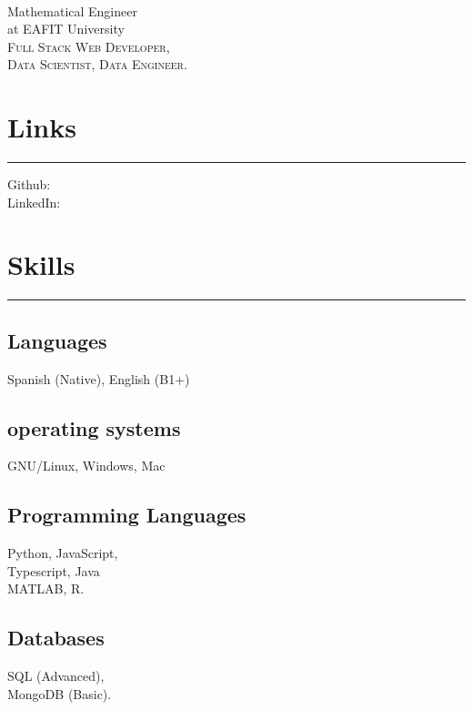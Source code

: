 \documentclass[]{rahulworld-resume}
\begin{document}
%
%

\begin{minipage}[t]{0.33\textwidth}
\begin{large}
\\
\end{large}
Mathematical Engineer\\
at EAFIT University\\
\textsc{Full Stack Web Developer, \\Data Scientist, Data Engineer.}


\section{Links}
\noindent\rule{5cm}{0.4pt}

Github: \href{https://github.com/jamerrq}{} \\
LinkedIn: \href{https://www.linkedin.com/in/jamerrq}{} \\
\section{Skills}
\noindent\rule{5cm}{0.4pt}
\subsection{Languages}
Spanish (Native), English (B1+)
\vspace{6pt}
\subsection{operating systems}
GNU/Linux, Windows, Mac
\vspace{6pt}
\subsection{Programming Languages}
Python, JavaScript, \\
Typescript, Java \\
MATLAB, R. \\

\subsection{Databases}
SQL (Advanced),\\ MongoDB (Basic).

\end{minipage}
\end{document}
